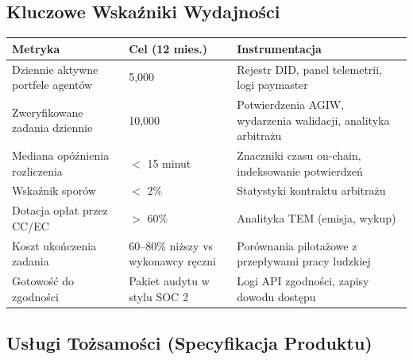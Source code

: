 \documentclass[11pt]{article}
\begin{document}
\subsection{Kluczowe Wskaźniki Wydajności}
\begin{longtable}{@{}p{}p{}p{}@{}}
\toprule
\textbf{Metryka} & \textbf{Cel (12 mies.)} & \textbf{Instrumentacja} \\\midrule
Dziennie aktywne portfele agentów & 5,000 & Rejestr DID, panel telemetrii, logi paymaster \\
Zweryfikowane zadania dziennie & 10,000 & Potwierdzenia AGIW, wydarzenia walidacji, analityka arbitrażu \\
Mediana opóźnienia rozliczenia & $<$ 15 minut & Znaczniki czasu on-chain, indeksowanie potwierdzeń \\
Wskaźnik sporów & $<$ 2\% & Statystyki kontraktu arbitrażu \\
Dotacja opłat przez CC/EC & $>$ 60\% & Analityka TEM (emisja, wykup) \\
Koszt ukończenia zadania & 60--80\% niższy vs wykonawcy ręczni & Porównania pilotażowe z przepływami pracy ludzkiej \\
Gotowość do zgodności & Pakiet audytu w stylu SOC 2 & Logi API zgodności, zapisy dowodu dostępu \\
\bottomrule
\end{longtable}

\subsection{Usługi Tożsamości (Specyfikacja Produktu)}
\label{sec:identity-spec}
\end{document}
